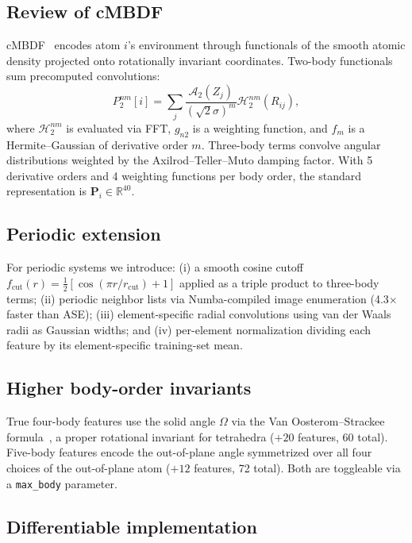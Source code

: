 \documentclass[twocolumn]{article}
\begin{document}
\subsection{Review of cMBDF}

cMBDF~\cite{khan2025} encodes atom $i$'s environment through functionals of the smooth atomic density projected onto rotationally invariant coordinates.
Two-body functionals sum precomputed convolutions:
\begin{equation}
    P_2^{nm}[i] = \sum_j \frac{\mathcal{A}_2(Z_j)}{(\sqrt{2}\sigma)^m} \mathcal{H}_2^{nm}(R_{ij}),
\end{equation}
where $\mathcal{H}_2^{nm}$ is evaluated via FFT, $g_{n2}$ is a weighting function, and $f_m$ is a Hermite--Gaussian of derivative order $m$.
Three-body terms convolve angular distributions weighted by the Axilrod--Teller--Muto damping factor.
With 5 derivative orders and 4 weighting functions per body order, the standard representation is $\mathbf{P}_i \in \mathbb{R}^{40}$.

\subsection{Periodic extension}

For periodic systems we introduce: (i) a smooth cosine cutoff $f_\text{cut}(r) = \tfrac{1}{2}[\cos(\pi r / r_\text{cut}) + 1]$ applied as a triple product to three-body terms; (ii) periodic neighbor lists via Numba-compiled image enumeration (4.3$\times$ faster than ASE); (iii) element-specific radial convolutions using van der Waals radii as Gaussian widths; and (iv) per-element normalization dividing each feature by its element-specific training-set mean.

\subsection{Higher body-order invariants}

True four-body features use the solid angle $\Omega$ via the Van Oosterom--Strackee formula~\cite{vanoosterom1983}, a proper rotational invariant for tetrahedra ($+20$ features, 60 total).
Five-body features encode the out-of-plane angle symmetrized over all four choices of the out-of-plane atom ($+12$ features, 72 total).
Both are toggleable via a \texttt{max\_body} parameter.

\subsection{Differentiable implementation}
\end{document}
